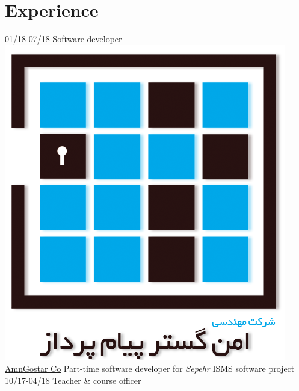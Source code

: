 \documentclass[a4paper]{./classes/friggeri-cv}
\begin{document}
    \section{Experience}\label{sec:experience}
    \begin{entrylist}
        \entry
        {01/18-07/18}
        {    Software developer}
        {\href{http://www.amngostar-co.com/}{\includegraphics[scale=0.04]{../assets/images/logos/AmnGostar_logo.png} AmnGostar Co}}
        {Part-time software developer for \emph{Sepehr} ISMS software project}
        \entry
        {10/17-04/18}
        {    Teacher \& course officer}

\end{entrylist}
\end{document}
